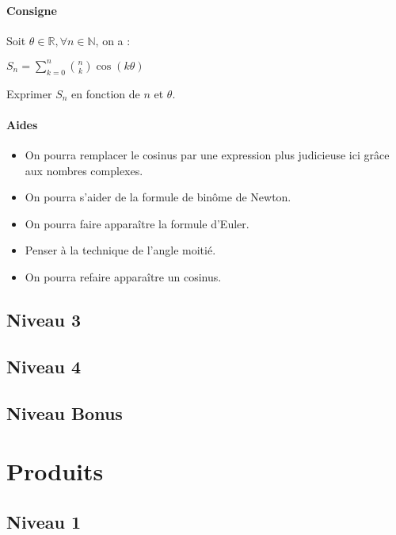 \documentclass[a4paper]{report}
\begin{document}
				\begin{tcolorbox}[colback=white,colframe=black,title=Exercice - Somme et trigonométrie]
					\paragraph{Consigne}
						Soit $\theta \in \mathbb{R}, \forall n \in \mathbb{N}$, on a :
						\begin{center}
							$S_n = \sum_{k=0}^{n} \binom{n}{k} \cos (k \theta)$
						\end{center}
						Exprimer $S_n$ en fonction de $n$ et $\theta$.
						
					\tcblower
					
					\paragraph{Aides}
						\begin{itemize}
							\item On pourra remplacer le cosinus par une expression plus judicieuse ici grâce aux nombres complexes.
							\item On pourra s'aider de la formule de binôme de Newton.
							\item On pourra faire apparaître la formule d'Euler.
							\item Penser à la technique de l'angle moitié.
							\item On pourra refaire apparaître un cosinus.
						\end{itemize}
				\end{tcolorbox}
			
			\subsection{Niveau 3}
			
			\subsection{Niveau 4}
			
			\subsection{Niveau Bonus}
			
		\section{Produits}
		
			\subsection{Niveau 1}
		
\end{document}
